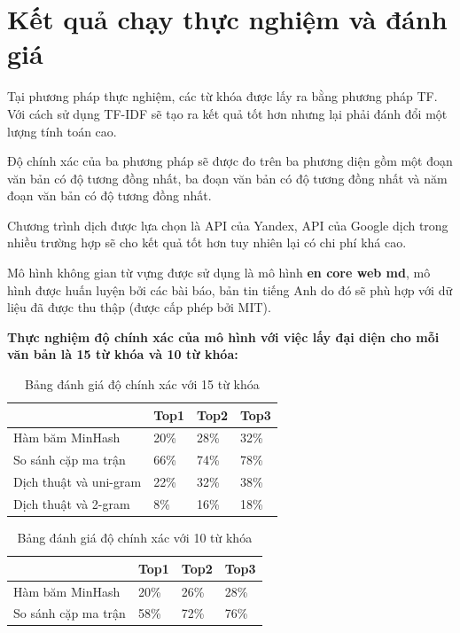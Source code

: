 \documentclass[12pt]{report}
\begin{document}
\section{Kết quả chạy thực nghiệm và đánh giá}

Tại phương pháp thực nghiệm, các từ khóa được lấy ra bằng phương pháp TF. Với cách sử dụng TF-IDF sẽ tạo ra kết quả tốt hơn nhưng lại phải đánh đổi một lượng tính toán cao.

Độ chính xác của ba phương pháp sẽ được đo trên ba phương diện gồm một đoạn văn bản có độ tương đồng nhất, ba đoạn văn bản có độ tương đồng nhất và năm đoạn văn bản có độ tương đồng nhất.

Chương trình dịch được lựa chọn là API của Yandex, API của Google dịch trong nhiều trường hợp sẽ cho kết quả tốt hơn tuy nhiên lại có chi phí khá cao.

Mô hình không gian từ vựng được sử dụng là mô hình \textbf{en core web md}, mô hình được huấn luyện bởi các bài báo, bản tin tiếng Anh do đó sẽ phù hợp với dữ liệu đã được thu thập (được cấp phép bởi MIT).

\textbf{Thực nghiệm độ chính xác của mô hình với việc lấy đại diện cho mỗi văn bản là 15 từ khóa và 10 từ khóa:}

\begin{table}[]
	\centering
	\caption{Bảng đánh giá độ chính xác với 15 từ khóa}
	\begin{tabular}{|l|l|l|l|}
	\hline
												 & Top1 & Top2 & Top3 \\ \hline
	Hàm băm MinHash        & 20\% & 28\% & 32\% \\ \hline
	So sánh cặp ma trận    & 66\% & 74\% & 78\% \\ \hline
	Dịch thuật và uni-gram & 22\% & 32\% & 38\% \\ \hline
	Dịch thuật và 2-gram   & 8\%  & 16\% & 18\% \\ \hline
	\end{tabular}
\end{table}

\begin{table}[]
	\centering
	\caption{Bảng đánh giá độ chính xác với 10 từ khóa}
	\begin{tabular}{|l|l|l|l|}
	\hline
												 & Top1 & Top2 & Top3 \\ \hline
	Hàm băm MinHash        & 20\% & 26\% & 28\% \\ \hline
	So sánh cặp ma trận    & 58\% & 72\% & 76\% \\ \hline
	\end{tabular}
\end{table}
\end{document}
